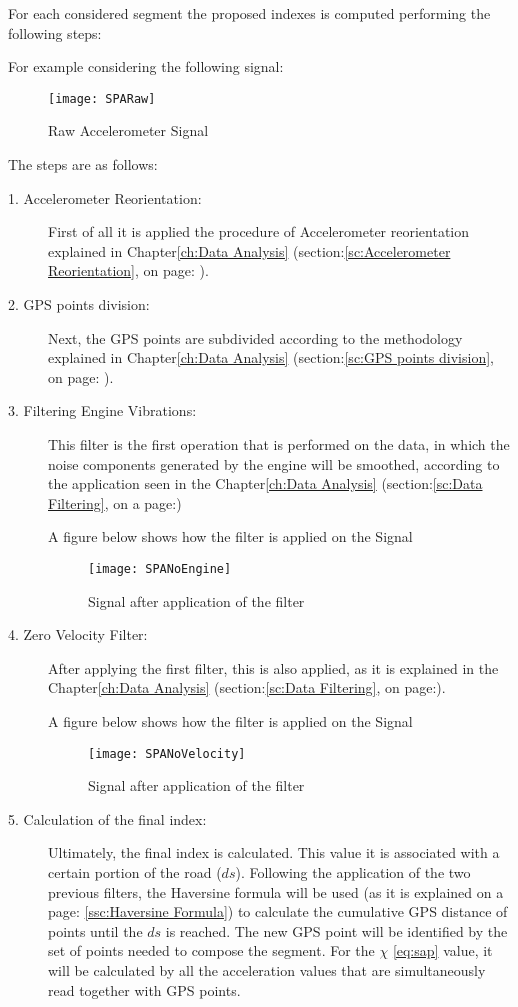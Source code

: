 \documentclass[tesi]{subfiles}
\begin{document}
For each considered segment the proposed indexes is computed performing the following steps:

For example considering the following signal:
\begin{figure}[H]
\centering
\texttt{[image: SPARaw]}
\caption{Raw Accelerometer Signal}
\end{figure}

The steps are as follows:

\begin{description}
\item[1. Accelerometer Reorientation:] First of all it is applied the procedure of Accelerometer reorientation explained in Chapter\ref{ch:Data Analysis} (section:\ref{sc:Accelerometer Reorientation}, on page: \pageref{sc:Accelerometer Reorientation}).
\item[2. GPS points division:] Next, the GPS points are subdivided according to the methodology explained in Chapter\ref{ch:Data Analysis} (section:\ref{sc:GPS points division}, on page: \pageref{sc:GPS points division}).
\item[3. Filtering Engine Vibrations:] This filter is the first operation that is performed on the data, in which the noise components generated by the engine will be smoothed, according to the application seen in the Chapter\ref{ch:Data Analysis} (section:\ref{sc:Data Filtering}, on a page:\pageref{sssc:Remove Engine Vibrations Filter})

A figure below shows how the filter is applied on the Signal

\begin{figure}[H]
\centering
\texttt{[image: SPANoEngine]}
\caption{Signal after application of the filter}
\end{figure}
\item[4. Zero Velocity Filter:] After applying the first filter, this is also applied, as it is explained in the Chapter\ref{ch:Data Analysis} (section:\ref{sc:Data Filtering}, on page:\pageref{sssc:Zero Velocity Filter}).

A figure below shows how the filter is applied on the Signal
\begin{figure}[H]
\centering
\texttt{[image: SPANoVelocity]}
\caption{Signal after application of the filter}
\end{figure}

\item[5. Calculation of the final index:] Ultimately, the final index is calculated.
This value it is associated with a certain portion of the road ($ds$). Following the application of the two previous filters, the Haversine formula will be used (as it is explained on a page: \ref{ssc:Haversine Formula}) to calculate the cumulative GPS distance of points until the $ds$ is reached. The new GPS point will be identified by the set of points needed to compose the segment. For the $\chi$ \thinspace \ref{eq:sap} value, it will be calculated by all the acceleration values that are simultaneously read together with GPS points.


\end{description}
\end{document}
